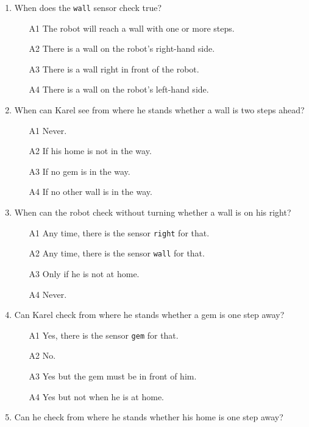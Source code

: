 \documentclass[article,A4,12pt]{llncs}
\begin{document}
{{{{\begin{enumerate}
\begin{enumerate}
\item[A3] Robot's home is straight ahead of the robot.
\item[A4] The robot needs to go home to drop all gems that he collected.
\end{enumerate}
\item When does the {\tt wall} sensor check true?
\begin{enumerate}
\item[A1] The robot will reach a wall with one or more steps. 
\item[A2] There is a wall on the robot's right-hand side.
\item[A3] There is a wall right in front of the robot.
\item[A4] There is a wall on the robot's left-hand side.
\end{enumerate}
\item When can Karel see from where he stands whether a wall is two steps ahead?
\begin{enumerate}
\item[A1] Never.
\item[A2] If his home is not in the way.
\item[A3] If no gem is in the way.
\item[A4] If no other wall is in the way.
\end{enumerate}
\item When can the robot check without turning whether a wall is on his right?
\begin{enumerate}
\item[A1] Any time, there is the sensor {\tt right} for that.
\item[A2] Any time, there is the sensor {\tt wall} for that.
\item[A3] Only if he is not at home.
\item[A4] Never.
\end{enumerate}
\item Can Karel check from where he stands whether a gem is one step away?
\begin{enumerate}
\item[A1] Yes, there is the sensor {\tt gem} for that.
\item[A2] No.
\item[A3] Yes but the gem must be in front of him.
\item[A4] Yes but not when he is at home.
\end{enumerate}
\item Can he check from where he stands whether his home is one step away?

\end{enumerate}}}}}
\end{document}
